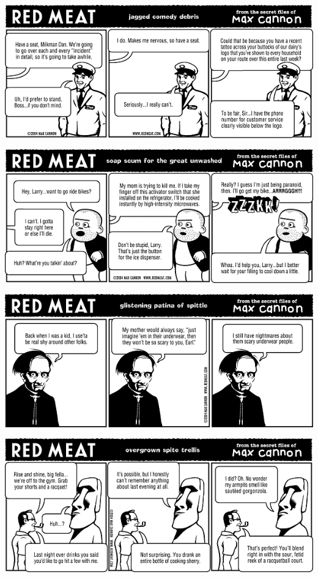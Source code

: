 \documentclass[a4paper,twoside,11pt]{article}
\begin{document}
\includegraphics[width=\textwidth]{redmeat_2004-09-28.png}



\includegraphics[width=\textwidth]{redmeat_2004-10-05.png}



\includegraphics[width=\textwidth]{redmeat_2004-10-12.png}



\includegraphics[width=\textwidth]{redmeat_2004-10-19.png}
\end{document}

